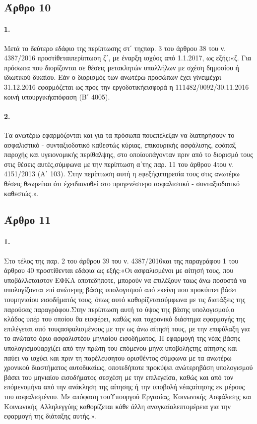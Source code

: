 \documentclass[a4paper,oneside, 10pt]{book}
\begin{document}
\subsection*{ Άρθρο 10 }
\paragraph { 1. } Μετά το δεύτερο εδάφιο της περίπτωσης στ΄ τηςπαρ. 3 του άρθρου 38 του ν. 4387/2016 προστίθεταιπερίπτωση ζ΄, με έναρξη ισχύος από 1.1.2017, ως εξής:«ζ. Για πρόσωπα που διορίζονται σε θέσεις μετακλητών υπαλλήλων με σχέση δημοσίου ή ιδιωτικού δικαίου. Εάν ο διορισμός των ανωτέρω προσώπων έχει γίνειμέχρι 31.12.2016 εφαρμόζεται ως προς την εργοδοτικήεισφορά η 111482/0092/30.11.2016 κοινή υπουργικήαπόφαση (Β΄ 4005).
\paragraph { 2. } Τα ανωτέρω εφαρμόζονται και για τα πρόσωπα πουεπέλεξαν να διατηρήσουν το ασφαλιστικό - συνταξιοδοτικό καθεστώς κύριας, επικουρικής ασφάλισης, εφάπαξ παροχής και υγειονομικής περίθαλψης, στο οποίουπάγονταν πριν από το διορισμό τους στις θέσεις αυτές,σύμφωνα με την περίπτωση α΄της παρ. 11 του άρθρου 4του ν. 4151/2013 (Α΄ 103). Στην περίπτωση αυτή η εφεξήςυπηρεσία τους στις ανωτέρω θέσεις θεωρείται ότι έχειδιανυθεί στο προγενέστερο ασφαλιστικό - συνταξιοδοτικό καθεστώς.».
\subsection*{ Άρθρο 11 }
\paragraph { 1. } Στο τέλος της παρ. 2 του άρθρου 39 του ν. 4387/2016και της παραγράφου 1 του άρθρου 40 προστίθενται εδάφια ως εξής:«Οι ασφαλισμένοι με αίτησή τους, που υποβάλλεταιστον ΕΦΚΑ οποτεδήποτε, μπορούν να επιλέξουν ταως άνω ποσοστά να υπολογίζονται επί ανώτερης βάσης υπολογισμού από εκείνη που προκύπτει βάσει τουμηνιαίου εισοδήματός τους, όπως αυτό καθορίζεταισύμφωνα με τις διατάξεις της παρούσας παραγράφου.Στην περίπτωση αυτή το ύψος της βάσης υπολογισμού,ο κλάδος υπέρ του οποίου θα εισφέρει, καθώς και τοχρονικό διάστημα εφαρμογής της επιλέγεται από τουςασφαλισμένους με την ως άνω αίτησή τους, με την επιφύλαξη για το ανώτατο όριο ασφαλιστέου μηνιαίου εισοδήματος. Η εφαρμογή της νέας βάσης υπολογισμούαρχίζει από την πρώτη του επόμενου μήνα υποβολήςτης αίτησης και παύει να ισχύει και πριν τη παρέλευσητου ορισθέντος σύμφωνα με τα ανωτέρω χρονικού διαστήματος αυτοδικαίως, οποτεδήποτε προκύψει ανώτερηβάση υπολογισμού βάσει του μηνιαίου εισοδήματος σεσχέση με την επιλεγείσα, καθώς και από τον επόμενομήνα από την ανάκληση της αίτησης ή την υποβολή νέαςαίτησης εκ μέρους του ασφαλισμένου. Με απόφαση τουΥπουργού Εργασίας, Κοινωνικής Ασφάλισης και Κοινωνικής Αλληλεγγύης καθορίζεται κάθε άλλη αναγκαίαλεπτομέρεια για την εφαρμογή της διάταξης αυτής.».
\end{document}
